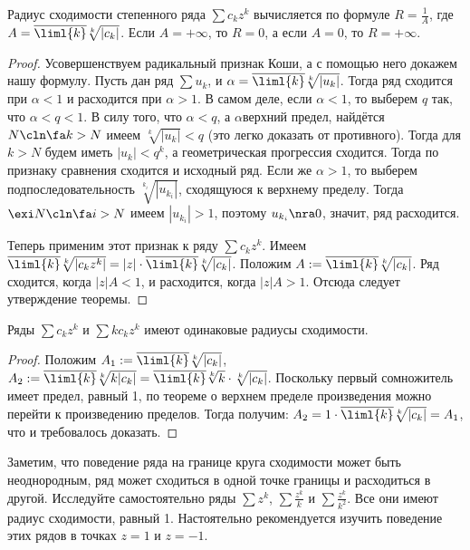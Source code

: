 \documentclass[a4paper]{article}
\begin{document}
\begin{theorem}
Радиус сходимости степенного ряда $\sum c_k z^k$ вычисляется по формуле $R = \frac{1}{A}$, где
$A=\overline{\liml{k}} \sqrt[k]{|c_k|}$. Если $A = +\infty$, то $R = 0$, а если $A=0$, то $R = +\infty$.
\end{theorem}
\begin{proof}
Усовершенствуем радикальный признак Коши, а с помощью него докажем нашу формулу. Пусть дан ряд $\sum u_k$, и
$\alpha = \overline{\liml{k}}\sqrt[k]{|u_k|}$. Тогда ряд сходится при $\alpha < 1$ и расходится при $\alpha > 1$.
В самом деле, если $\alpha < 1$, то выберем $q$ так, что $\alpha < q < 1$. В силу того, что $\alpha < q$,
а $\alpha$\т верхний предел, найдётся $N \cln \fa k > N$ имеем $\sqrt[k]{|u_k|} < q$ (это легко доказать от противного).
Тогда для $k > N$ будем иметь $|u_k| < q^k$, а геометрическая прогрессия сходится.
Тогда по признаку сравнения сходится и исходный ряд. Если же $\alpha > 1$, то выберем
подпоследовательность $\sqrt[k_i]{|u_{k_i}|}$, сходящуюся
к верхнему пределу. Тогда $\exi N \cln \fa i > N$ имеем $|u_{k_i}| > 1$, поэтому
$u_{k_i} \nra 0$, значит, ряд расходится.

Теперь применим этот признак к ряду $\sum c_k z^k$. Имеем
$\overline{\liml{k}}\sqrt[k]{|c_kz^k|}=|z|\cdot\overline{\liml{k}}\sqrt[k]{|c_k|}$.
Положим $A := \overline{\liml{k}}\sqrt[k]{|c_k|}$. Ряд сходится, когда $|z|A < 1$, и
расходится, когда $|z|A>1$. Отсюда следует утверждение теоремы.
\end{proof}

\begin{theorem}
Ряды $\sum c_k z^k$ и $\sum k c_kz^k$ имеют одинаковые радиусы сходимости.
\end{theorem}
\begin{proof}
Положим $A_1 := \overline{\liml{k}}\sqrt[k]{|c_k|}$, $A_2 := \overline{\liml{k}}\sqrt[k]{k|c_k|}=
\overline{\liml{k}}\sqrt[k]{k}\cdot\sqrt[k]{|c_k|}$. Поскольку первый сомножитель имеет
предел, равный 1, по теореме о верхнем пределе произведения
можно перейти к произведению пределов. Тогда получим:
$A_2 = 1 \cdot \overline{\liml{k}}\sqrt[k]{|c_k|} = A_1$, что и требовалось доказать.
\end{proof}

Заметим, что поведение ряда на границе круга сходимости может быть неоднородным,  ряд
может сходиться в одной точке границы и расходиться
в другой. Исследуйте самостоятельно ряды $\sum z^k$, $\sum \frac{z^k}{k}$ и $\sum \frac{z^k}{k^2}$. Все они
имеют радиус сходимости, равный 1. Настоятельно рекомендуется изучить поведение этих рядов в точках $z=1$ и $z=-1$.
\end{document}

